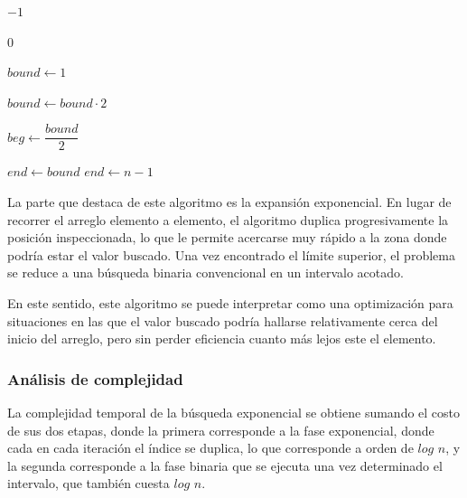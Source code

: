 \begin{algorithm}
    \caption{Búsqueda exponencial $\triangleright$ $V[0..n-1]$}
    \begin{algorithmic}[1]

            \State \Return $-1$
        \EndIf

            \State \Return $0$
        \EndIf

        \State $bound \gets 1$

            \State $bound \gets bound \cdot 2$
        \EndWhile

        \State $beg \gets \dfrac{bound}{2}$

            \State $end \gets bound$
        \Else
            \State $end \gets n - 1$
        \EndIf

        \State \Return {}

        \EndProcedure
    \end{algorithmic}
\end{algorithm}

La parte que destaca de este algoritmo es la expansión exponencial. En lugar de recorrer el arreglo elemento a elemento, el algoritmo duplica progresivamente la posición inspeccionada, lo que le permite acercarse muy rápido a la zona donde podría estar el valor buscado. Una vez encontrado el límite superior, el problema se reduce a una búsqueda binaria convencional en un intervalo acotado.

En este sentido, este algoritmo se puede interpretar como una optimización para situaciones en las que el valor buscado podría hallarse relativamente cerca del inicio del arreglo, pero sin perder eficiencia cuanto más lejos este el elemento.

\subsubsection{Análisis de complejidad}
La complejidad temporal de la búsqueda exponencial se obtiene sumando el costo de sus dos etapas, donde la primera corresponde a la fase exponencial, donde cada en cada iteración el índice se duplica, lo que corresponde a orden de $log$ $n$, y la segunda corresponde a la fase binaria que se ejecuta una vez determinado el intervalo, que también cuesta $log$ $n$.


